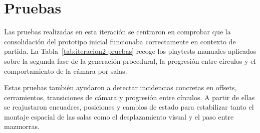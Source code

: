 \section{Pruebas}
Las pruebas realizadas en esta iteración se centraron en comprobar que la consolidación del
prototipo inicial funcionaba correctamente en contexto de partida. La Tabla~\ref{tab:iteracion2-pruebas} recoge
los playtests manuales aplicados sobre la segunda fase de la generación procedural, la
progresión entre círculos y el comportamiento de la cámara por salas.

Estas pruebas también ayudaron a detectar incidencias concretas en offsets, cerramientos,
transiciones de cámara y progresión entre círculos. A partir de ellas se reajustaron
encuadres, posiciones y cambios de estado para estabilizar tanto el montaje espacial de las
salas como el desplazamiento visual y el paso entre mazmorras.


